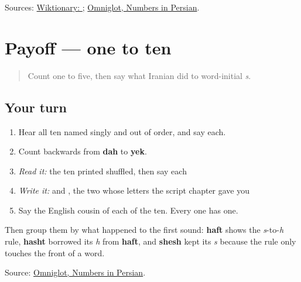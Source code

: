 \begin{tcolorbox}[breakable,colback=teal!4,colframe=teal!35!black,title={Before you move on}]
Sources: \href{https://en.wiktionary.org/wiki/\%D8\%AF\%D9\%87}{Wiktionary: }; \href{https://www.omniglot.com/language/numbers/persian.htm}{Omniglot, Numbers in Persian}.
\end{tcolorbox}
\section[Practice]{Payoff — one to ten}

\label{lesson:FA-C17-practice}



\begin{quote}
Count one to five, then say what Iranian did to word-initial \emph{s}.
\end{quote}

\subsection*{Your turn}
\begin{enumerate}
\raggedright
  \item Hear all ten named singly and out of order, and say each.
  \item Count backwards from \textbf{dah} to \textbf{yek}.
  \item \emph{Read it:} the ten printed shuffled, then say each
  \item \emph{Write it:} \textbf{} and \textbf{}, the two whose letters the script chapter gave you
  \item Say the English cousin of each of the ten. Every one has one.
\end{enumerate}

Then group them by what happened to the first sound: \textbf{haft} shows the \emph{s}-to-\emph{h} rule, \textbf{hasht} borrowed its \emph{h} from \textbf{haft}, and \textbf{shesh} kept its \emph{s} because the rule only touches the front of a word.

\begin{tcolorbox}[breakable,colback=teal!4,colframe=teal!35!black,title={Before you move on}]
Source: \href{https://www.omniglot.com/language/numbers/persian.htm}{Omniglot, Numbers in Persian}.
\end{tcolorbox}
